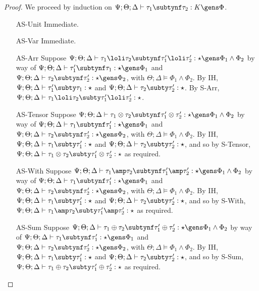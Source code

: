 \begin{proof}
 We proceed by induction on $\Psi ; \Theta ; \Delta \vdash \tau_1 \subtynf \tau_2 : K \gens \Phi$.

\begin{itemize}
  \item[AS-Unit] Immediate.
  \item[AS-Var] Immediate.
  \item[AS-Arr] Suppose $\Psi ; \Theta ; \Delta \vdash \tau_1 \loli \tau_2 \subtynf \tau_1' \loli \tau_2' : \star \gens \Phi_1 \wedge \Phi_2$ by way of $\Psi ; \Theta ; \Delta \vdash \tau_1' \subtynf \tau_1 : \star \gens \Phi_1$ and $\Psi ; \Theta ; \Delta \vdash \tau_2 \subtynf \tau_2' : \star \gens \Phi_2$, with $\Theta ; \Delta \vDash \Phi_1 \wedge \Phi_2$. By IH, $\Psi ; \Theta ; \Delta \vdash \tau_1' \subty \tau_1 : \star$ and $\Psi ; \Theta ; \Delta \vdash \tau_2 \subty \tau_2' : \star$. By S-Arr, $\Psi ; \Theta ; \Delta \vdash \tau_1 \loli \tau_2 \subty \tau_1' \loli \tau_2' : \star$.
  \item[AS-Tensor] Suppose $\Psi ; \Theta ; \Delta \vdash \tau_1 \otimes \tau_2 \subtynf \tau_1' \otimes \tau_2' : \star \gens \Phi_1 \wedge \Phi_2$ by way of $\Psi ; \Theta ; \Delta \vdash \tau_1 \subtynf \tau_1' : \star  \gens \Phi_1$ and $\Psi ; \Theta ; \Delta \vdash \tau_2 \subtynf \tau_2' : \star \gens \Phi_2$, with $\Theta ; \Delta \vDash \Phi_1 \wedge \Phi_2$. By IH, $\Psi ; \Theta ; \Delta \vdash \tau_1 \subty \tau_1' : \star$ and $\Psi ; \Theta ; \Delta \vdash \tau_2 \subty \tau_2' : \star$, and so by S-Tensor, $\Psi ; \Theta ; \Delta \vdash \tau_1 \otimes \tau_2 \subty \tau_1' \otimes \tau_2' : \star$ as required.
  \item[AS-With] Suppose $\Psi ; \Theta ; \Delta \vdash \tau_1 \amp \tau_2 \subtynf \tau_1' \amp \tau_2' : \star \gens \Phi_1 \wedge \Phi_2$ by way of $\Psi ; \Theta ; \Delta \vdash \tau_1 \subtynf \tau_1' : \star  \gens \Phi_1$ and $\Psi ; \Theta ; \Delta \vdash \tau_2 \subtynf \tau_2' : \star \gens \Phi_2$, with $\Theta ; \Delta \vDash \Phi_1 \wedge \Phi_2$. By IH, $\Psi ; \Theta ; \Delta \vdash \tau_1 \subty \tau_1' : \star$ and $\Psi ; \Theta ; \Delta \vdash \tau_2 \subty \tau_2' : \star$, and so by S-With, $\Psi ; \Theta ; \Delta \vdash \tau_1 \amp \tau_2 \subty \tau_1' \amp \tau_2' : \star$ as required.
  \item[AS-Sum] Suppose $\Psi ; \Theta ; \Delta \vdash \tau_1 \oplus \tau_2 \subtynf \tau_1' \oplus \tau_2' : \star \gens \Phi_1 \wedge \Phi_2$ by way of $\Psi ; \Theta ; \Delta \vdash \tau_1 \subtynf \tau_1' : \star  \gens \Phi_1$ and $\Psi ; \Theta ; \Delta \vdash \tau_2 \subtynf \tau_2' : \star \gens \Phi_2$, with $\Theta ; \Delta \vDash \Phi_1 \wedge \Phi_2$. By IH, $\Psi ; \Theta ; \Delta \vdash \tau_1 \subty \tau_1' : \star$ and $\Psi ; \Theta ; \Delta \vdash \tau_2 \subty \tau_2' : \star$, and so by S-Sum, $\Psi ; \Theta ; \Delta \vdash \tau_1 \oplus \tau_2 \subty \tau_1' \oplus \tau_2' : \star$ as required.

\end{itemize}
\end{proof}
